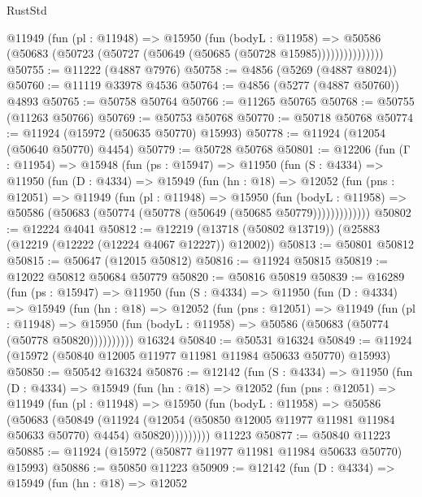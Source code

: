 \begin{lexlean}{RustStd}
\begin{coremodule}
{\begin{coremodule}
{{{{{{{{{{{{{{{{{{{{{{{{{{{{{{{{{{{{{{{{{{{{{{{{{{{{{{{{{{{{{{{{{{{{{{{{{{{{{{{{                @11949
                  (fun (pl : @11948) =>
                  @15950
                    (fun (bodyL : @11958) =>
                    @50586 (@50683 (@50723 (@50727 (@50649 (@50685 (@50728 @15985)))))))))))))))
@50755 := @11222 (@4887 @7976)
@50758 := @4856 (@5269 (@4887 @8024))
@50760 := @11119 @33978 @4536
@50764 := @4856 (@5277 (@4887 @50760)) @4893
@50765 := @50758 @50764
@50766 := @11265 @50765
@50768 := @50755 (@11263 @50766)
@50769 := @50753 @50768
@50770 := @50718 @50768
@50774 := @11924 (@15972 (@50635 @50770) @15993)
@50778 := @11924 (@12054 (@50640 @50770) @4454)
@50779 := @50728 @50768
@50801 := @12206
    (fun (Γ : @11954) =>
    @15948
      (fun (ps : @15947) =>
      @11950
        (fun (S : @4334) =>
        @11950
          (fun (D : @4334) =>
          @15949
            (fun (hn : @18) =>
            @12052
              (fun (pns : @12051) =>
              @11949
                (fun (pl : @11948) =>
                @15950
                  (fun (bodyL : @11958) =>
                  @50586 (@50683 (@50774 (@50778 (@50649 (@50685 @50779)))))))))))))
@50802 := @12224 @4041
@50812 := @12219 (@13718 (@50802 @13719)) (@25883 (@12219 (@12222 (@12224 @4067 @12227)) @12002))
@50813 := @50801 @50812
@50815 := @50647 (@12015 @50812)
@50816 := @11924 @50815
@50819 := @12022 @50812 @50684 @50779
@50820 := @50816 @50819
@50839 := @16289
    (fun (ps : @15947) =>
    @11950
      (fun (S : @4334) =>
      @11950
        (fun (D : @4334) =>
        @15949
          (fun (hn : @18) =>
          @12052
            (fun (pns : @12051) =>
            @11949
              (fun (pl : @11948) =>
              @15950 (fun (bodyL : @11958) => @50586 (@50683 (@50774 (@50778 @50820))))))))))
    @16324
@50840 := @50531 @16324
@50849 := @11924 (@15972 (@50840 @12005 @11977 @11981 @11984 @50633 @50770) @15993)
@50850 := @50542 @16324
@50876 := @12142
    (fun (S : @4334) =>
    @11950
      (fun (D : @4334) =>
      @15949
        (fun (hn : @18) =>
        @12052
          (fun (pns : @12051) =>
          @11949
            (fun (pl : @11948) =>
            @15950
              (fun (bodyL : @11958) =>
              @50586
                (@50683
                  (@50849
                    (@11924
                      (@12054 (@50850 @12005 @11977 @11981 @11984 @50633 @50770) @4454)
                      @50820)))))))))
    @11223
@50877 := @50840 @11223
@50885 := @11924 (@15972 (@50877 @11977 @11981 @11984 @50633 @50770) @15993)
@50886 := @50850 @11223
@50909 := @12142
    (fun (D : @4334) =>
    @15949
      (fun (hn : @18) =>
      @12052
}}}}}}}}}}}}}}}}}}}}}}}}}}}}}}}}}}}}}}}}}}}}}}}}}}}}}}}}}}}}}}}}}}}}}}}}}}}}}}}}
\end{coremodule}}
\end{coremodule}
\end{lexlean}
